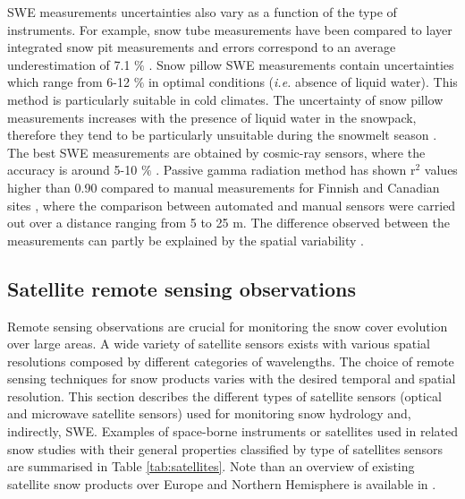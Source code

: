 \documentclass[utf8]{frontiersSCNS} %
\begin{document}
SWE measurements uncertainties also vary as a function of the type of instruments. For example, snow tube measurements have been compared to layer integrated snow pit measurements and errors correspond to an average underestimation of 7.1 $\%$ \citep{Sturm_2010}. Snow pillow SWE measurements contain uncertainties which range from 6-12 $\%$ in optimal conditions (\textit{i.e.} absence of liquid water). This method is particularly suitable in cold climates. The uncertainty of snow pillow measurements increases with the presence of liquid water in the snowpack, therefore they tend to be particularly unsuitable during the snowmelt season \citep{Smith_2017,Engeset_2000}. The best SWE measurements are obtained by cosmic-ray sensors, where the accuracy is around 5-10 $\%$ \citep{Gottardi_2013}. Passive gamma radiation method has shown r$^{2}$ values higher than 0.90 compared to manual measurements for Finnish and Canadian sites \citep{Smith_2017}, where the comparison between automated and manual sensors were carried out over a distance ranging from 5 to 25 m. The difference observed between the measurements can partly be explained by the spatial variability \citep{Lejeune_2018,Smith_2017}. %




\subsection{Satellite remote sensing observations}

Remote sensing observations are crucial for monitoring the snow cover evolution over large areas. A wide variety of satellite sensors exists with various spatial resolutions composed by different categories of wavelengths. The choice of remote sensing techniques for snow products varies with the desired temporal and spatial resolution. This section describes the different types of satellite sensors (optical and microwave satellite sensors) used for monitoring snow hydrology and, indirectly, SWE. Examples of space-borne instruments or satellites used in related snow studies with their general properties classified by type of satellites sensors are summarised in Table \ref{tab:satellites}. Note than an overview of existing satellite snow products over Europe and Northern Hemisphere is available in \citet{Bartsch_2018}. 
\end{document}
